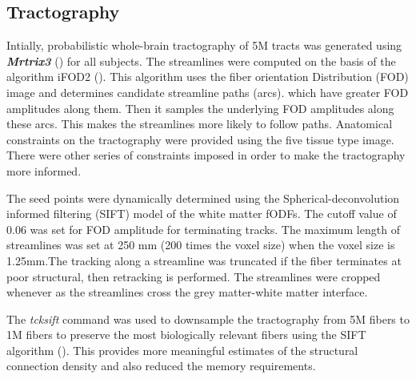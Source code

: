 \documentclass[msthesis.tex]{subfiles}
\begin{document}
\subsection{Tractography}

Intially, probabilistic  whole-brain tractography of 5M tracts was generated using \textbf{\textit{Mrtrix3}} (\cite{tournier2019mrtrix3}) for all subjects. The streamlines were computed on the basis of the algorithm iFOD2 (\cite{tournier2010improved}). This algorithm uses the fiber orientation Distribution (FOD) image and determines candidate streamline paths (arcs). which have greater FOD amplitudes along them. Then it samples the underlying FOD amplitudes along these arcs. This makes the streamlines more likely to follow paths. Anatomical constraints on the tractography were provided using the five tissue type image. There were other series of constraints imposed in order to make the  tractography more informed. 

The seed points were dynamically determined using the Spherical-deconvolution informed filtering (SIFT) model \cite{smith2013sift} of the white matter fODFs. The cutoff value of 0.06 was set for FOD amplitude for terminating tracks. The maximum length of streamlines was set at 250 mm (200 times the voxel size) when the voxel size is 1.25mm.The tracking along a streamline was truncated if the fiber terminates at poor structural, then  retracking is performed. The streamlines were cropped whenever as the streamlines cross the grey matter-white matter interface. 

The \textit{tcksift} command was used to downsample the tractography from 5M fibers to 1M fibers to preserve the most biologically relevant fibers using the SIFT algorithm (\cite{smith2013sift}). This provides more meaningful estimates of the structural connection density and also reduced the memory requirements. 

\end{document}
